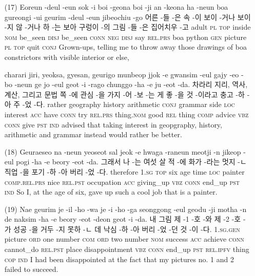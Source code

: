 \begin{itemize}
\item [(17)]
\tgl
		{Eoreun -deul -eun sok -i boi -geona boi -ji an -keona ha -neun boa gureongi -ui geurim -deul -eun jibeochiu -go}
		{어른 -들 -은 속 -이 보이 -거나 보이 -지 않 -거나 하 -는 보아 구렁이 -의 그림 -들 -은 집어치우 -고}
		{adult	\textsc{pl}	\textsc{top}	inside	\textsc{nom}	be\_seen	\textsc{disj}	be\_seen	\textsc{conn}	\textsc{neg}	\textsc{disj}	say	\textsc{rel.prs}	boa	python	\textsc{gen}	picture	\textsc{pl}	\textsc{top}	quit	\textsc{conj}}
		{Grown-ups, telling me to throw away those drawings of boa constrictors with visible interior or else,}

\tgl
		{charari jiri, yeoksa, gyesan, geurigo munbeop jjok -e gwansim -eul gajy -eo -bo -neun ge jo -eul geot -i -rago chunggo -ha -e ju -eot -da.}
		{차라리 지리, 역사, 계산, 그리고 문법 쪽 -에 관심 -을 가지 -어 -보 -는 게 좋 -을 것 -이라고 충고 -하 -아 주 -었 -다.}
		{rather	geography	history	arithmetic	\textsc{conj}	grammar	side	\textsc{loc}	interest	\textsc{acc}	have	\textsc{conn}	try	\textsc{rel.prs}	thing.\textsc{nom}	good	\textsc{rel}	thing	\textsc{comp}	advice	\textsc{vbz}	\textsc{conn}	give	\textsc{pst}	\textsc{ind}}
		{advised that taking interest in geopgraphy, history, arithmetic and grammar instead would rather be better.}

\item [(18)]
\tgl
		{Geuraeseo na -neun yeoseot sal jeok -e hwaga -raneun meotji -n jikeop -eul pogi -ha -e beory -eot -da.}
		{그래서 나 -는 여섯 살 적 -에 화가 -라는 멋지 -ㄴ 직업 -을 포기 -하 -아 버리 -었 -다.}
		{therefore	\textsc{1.sg}	\textsc{top}	six	age	time	\textsc{loc} 	painter	\textsc{comp.rel.prs}	nice	\textsc{rel.pst}	occupation	\textsc{acc}	giving\_up	\textsc{vbz}	\textsc{conn}	end\_up	\textsc{pst}	\textsc{ind}}
		{So I, at the age of six, gave up such a cool job that is a painter.}

\item [(19)]
\tgl
		{Nae geurim je -il -ho -wa je -i -ho -ga seonggong -eul geodu -ji motha -n de naksim -ha -e beory -eot -deon geot -i -da.}
		{내 그림 제 -1 -호 -와 제 -2 -호 -가 성공 -을 거두 -지 못하 -ㄴ 데 낙심 -하 -아 버리 -었 -던 것 -이 -다.}
		{\textsc{1.sg.gen}	picture	\textsc{ord}	one	number	\textsc{com} \textsc{ord}	two	number	\textsc{nom}	success	\textsc{acc}	achieve	\textsc{conn}	cannot\_do	\textsc{rel.pst}	place	disappointment	\textsc{vbz}	\textsc{conn}	end\_up	\textsc{pst}	\textsc{rel.ipfv}	thing	\textsc{cop}	\textsc{ind}}
		{I had been disappointed at the fact that my pictures no. 1 and 2 failed to succeed.}


\end{itemize}
